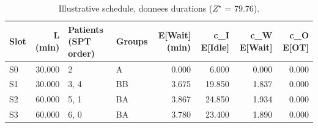 \begin{table}[htbp]
\caption{Illustrative schedule, donnees durations ($Z^\star$ = 79.76).}
\label{tab:planning-donnees}
\begin{tabular}{lrllrrrr}
\toprule
Slot & L (min) & Patients (SPT order) & Groups & E[Wait] (min) & c\_I E[Idle] & c\_W E[Wait] & c\_O E[OT] \\
\midrule
S0 & 30.000 & 2 & A & 0.000 & 6.000 & 0.000 & 0.000 \\
S1 & 30.000 & 3, 4 & BB & 3.675 & 19.850 & 1.837 & 0.000 \\
S2 & 60.000 & 5, 1 & BA & 3.867 & 24.850 & 1.934 & 0.000 \\
S3 & 60.000 & 6, 0 & BA & 3.780 & 23.400 & 1.890 & 0.000 \\
\bottomrule
\end{tabular}
\end{table}
